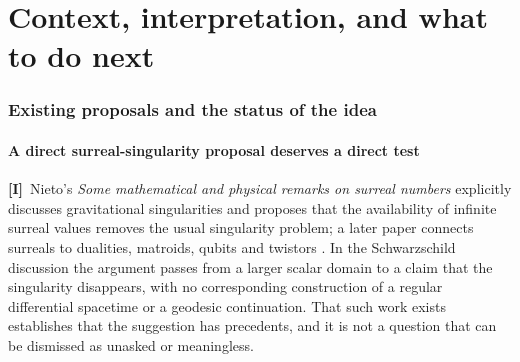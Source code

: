 \documentclass[11pt,letterpaper]{article}
\numberwithin{equation}{section}
\theoremstyle{definition}
\theoremstyle{remark}
\newcommand{\TI}{\textcolor{TierI}{\textsf{\bfseries[I]}}}
\begin{document}
\part{Context, interpretation, and what to do next}
\label{phys:part:context}

\section{Existing proposals and the status of the idea}
\label{phys:sec:proposals}

\subsection{A direct surreal-singularity proposal deserves a direct test}
\label{phys:sub:nieto}

\TI\ Nieto's \emph{Some mathematical and physical remarks on surreal numbers}
explicitly discusses gravitational singularities and proposes that the
availability of infinite surreal values removes the usual singularity problem;
a later paper connects surreals to dualities, matroids, qubits and twistors
\cite{phys:Nieto2016,phys:Nieto2018}. In the Schwarzschild discussion the
argument passes from a larger scalar domain to a claim that the singularity
disappears, with no corresponding construction of a regular differential
spacetime or a geodesic continuation. That such work exists establishes that
the suggestion has precedents, and it is not a question that can be dismissed
as unasked or meaningless.
\end{document}
